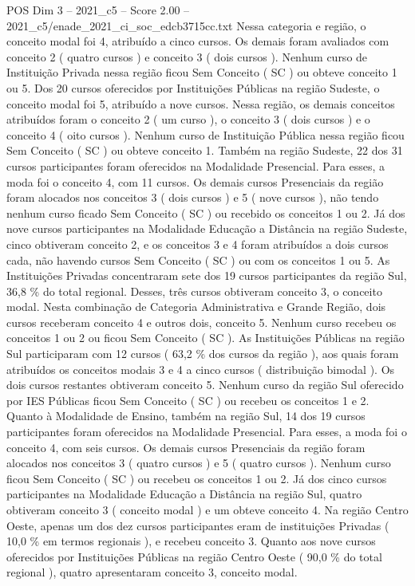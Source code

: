 \begin{textsample}{POS Dim 3 – 2021\_c5 – Score 2.00 – 2021\_c5/enade\_2021\_ci\_soc\_edcb3715cc.txt}
Nessa categoria e região, o conceito modal foi 4, atribuído a cinco cursos.
Os demais foram avaliados com conceito 2 ( quatro cursos ) e conceito 3 ( dois cursos ).
Nenhum curso de Instituição Privada nessa região ficou Sem Conceito ( SC ) ou obteve conceito 1 ou 5.
Dos 20 cursos oferecidos por Instituições Públicas na região Sudeste, o conceito modal foi 5, atribuído a nove cursos.
Nessa região, os demais conceitos atribuídos foram o conceito 2 ( um curso ), o conceito 3 ( dois cursos ) e o conceito 4 ( oito cursos ).
Nenhum curso de Instituição Pública nessa região ficou Sem Conceito ( SC ) ou obteve conceito 1.
Também na região Sudeste, 22 dos 31 cursos participantes foram oferecidos na Modalidade Presencial.
Para esses, a moda foi o conceito 4, com 11 cursos.
Os demais cursos Presenciais da região foram alocados nos conceitos 3 ( dois cursos ) e 5 ( nove cursos ), não tendo nenhum curso ficado Sem Conceito ( SC ) ou recebido os conceitos 1 ou 2.
Já dos nove cursos participantes na Modalidade Educação a Distância na região Sudeste, cinco obtiveram conceito 2, e os conceitos 3 e 4 foram atribuídos a dois cursos cada, não havendo cursos Sem Conceito ( SC ) ou com os conceitos 1 ou 5.
As Instituições Privadas concentraram sete dos 19 cursos participantes da região Sul, 36,8 \% do total regional.
Desses, três cursos obtiveram conceito 3, o conceito modal.
Nesta combinação de Categoria Administrativa e Grande Região, dois cursos receberam conceito 4 e outros dois, conceito 5.
Nenhum curso recebeu os conceitos 1 ou 2 ou ficou Sem Conceito ( SC ).
As Instituições Públicas na região Sul participaram com 12 cursos ( 63,2 \% dos cursos da região ), aos quais foram atribuídos os conceitos modais 3 e 4 a cinco cursos ( distribuição bimodal ).
Os dois cursos restantes obtiveram conceito 5.
Nenhum curso da região Sul oferecido por IES Públicas ficou Sem Conceito ( SC ) ou recebeu os conceitos 1 e 2.
Quanto à Modalidade de Ensino, também na região Sul, 14 dos 19 cursos participantes foram oferecidos na Modalidade Presencial.
Para esses, a moda foi o conceito 4, com seis cursos.
Os demais cursos Presenciais da região foram alocados nos conceitos 3 ( quatro cursos ) e 5 ( quatro cursos ).
Nenhum curso ficou Sem Conceito ( SC ) ou recebeu os conceitos 1 ou 2.
Já dos cinco cursos participantes na Modalidade Educação a Distância na região Sul, quatro obtiveram conceito 3 ( conceito modal ) e um obteve conceito 4.
Na região Centro Oeste, apenas um dos dez cursos participantes eram de instituições Privadas ( 10,0 \% em termos regionais ), e recebeu conceito 3.
Quanto aos nove cursos oferecidos por Instituições Públicas na região Centro Oeste ( 90,0 \% do total regional ), quatro apresentaram conceito 3, conceito modal.

\end{textsample}
